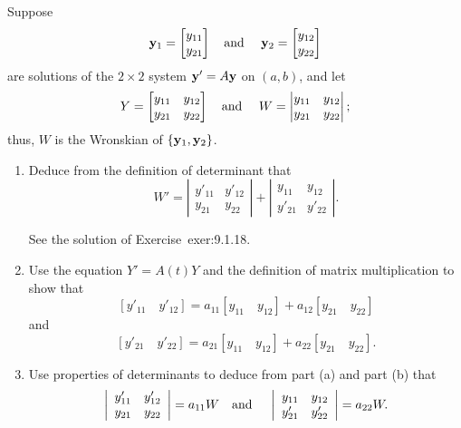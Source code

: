 \documentclass{ximera}
\begin{document}
\begin{problem}\label{exer:10.3.4}
 Suppose
$$
{\bf y}_1=\begin{bmatrix}y_{11}\\y_{21}\end{bmatrix}\mbox{\quad and \quad}
{\bf y}_2=\begin{bmatrix}y_{12}\\y_{22}\end{bmatrix}
$$
are solutions of the $2\times 2$ system ${\bf y}'=A{\bf y}$ on
$(a,b)$, and let
$$
 Y=\begin{bmatrix} y_{11} & y_{12}\\ y_{21} & y_{22}\end{bmatrix}\mbox{\quad and \quad}
W=\begin{vmatrix} y_{11}&y_{12}\\y_{21}&y_{22}\end{vmatrix};
$$ thus, $W$ is the Wronskian of $\{{\bf y}_1,{\bf y}_2\}$.
\begin{enumerate}
\item %
 Deduce from the definition of  determinant that
$$
W'=\left|\begin{array}{cc} {y'_{11}}&{y'_{12}}\\ {y_{21}}&
{y_{22}}\end{array}\right|
+\left|\begin{array}{cc} {y_{11}}&{y_{12}}\\
 {y'_{21}}&{y'_{22}}\end{array}\right|.
$$
\begin{solution}
    See the solution of Exercise~{exer:9.1.18}.
\end{solution}
\item %
 Use the equation $Y'=A(t)Y$ and
the definition of matrix multiplication to show that
$$
[y'_{11}\quad y'_{12}]=a_{11} [y_{11}\quad y_{12}]+a_{12} [y_{21}
\quad y_{22}]
$$
and
$$
[y'_{21}\quad  y'_{22}]=a_{21} [y_{11}\quad y_{12}]+a_{22}
[y_{21}\quad y_{22}].
$$
\item %
 Use  properties of determinants to deduce from part (a) and part (b)
 that
$$
\left|\begin{array}{cc} {y'_{11}}&{y'_{12}}\\ {y_{21}}&
{y_{22}}\end{array}\right|=a_{11}W\mbox{\quad and \quad}
\left|\begin{array}{cc} {y_{11}}&{y_{12}}\\
 {y'_{21}}&{y'_{22}}\end{array}\right|=a_{22}W.
$$


\end{enumerate}
\end{problem}
\end{document}
